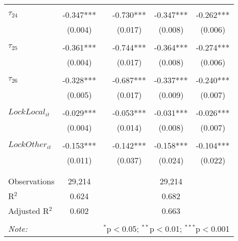 \begin{tabular}{@{\extracolsep{-5pt}}lccccc}
                &           &&           &           &           \\[-2.1ex]
$\tau_{24}$     & -0.347*** && -0.730*** & -0.347*** & -0.262*** \\
                &  (0.004)  &&  (0.017)  &  (0.008)  &  (0.006)  \\
                &           &&           &           &           \\[-2.1ex]
$\tau_{25}$     & -0.361*** && -0.744*** & -0.364*** & -0.274*** \\
                &  (0.004)  &&  (0.017)  &  (0.008)  &  (0.006)  \\
                &           &&           &           &           \\[-2.1ex]
$\tau_{26}$     & -0.328*** && -0.687*** & -0.337*** & -0.240*** \\
                &  (0.005)  &&  (0.017)  &  (0.009)  &  (0.007)  \\
                &           &&           &           &           \\[-1.ex]
$LockLocal_{it}$& -0.029*** && -0.053*** & -0.031*** & -0.026*** \\
                &  (0.004)  &&  (0.014)  &  (0.008)  &  (0.007)  \\
                &           &&           &           &           \\[-2.1ex]
$LockOther_{it}$& -0.153*** && -0.142*** & -0.158*** & -0.104*** \\
                &  (0.011)  &&  (0.037)  &  (0.024)  &  (0.022)  \\
                &           &&           &           &           \\[-2.1ex]

\hline \\[-1.8ex] 
Observations     & 29,214 && \multicolumn{3}{c}{29,214} \\ 
R$^{2}$          &  0.624 && \multicolumn{3}{c}{0.682 } \\ 
Adjusted R$^{2}$ &  0.602 && \multicolumn{3}{c}{0.663 } \\ 
\hline 
\hline \\[-1.8ex] 
\textit{Note:}  & \multicolumn{5}{r}{$^{*}$p$<$0.05; $^{**}$p$<$0.01; $^{***}$p$<$0.001} \\ 
\end{tabular} 